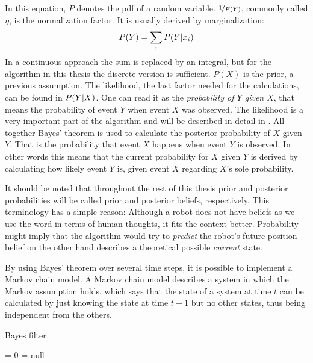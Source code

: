 \documentclass[Thesis.tex]{subfiles}
\begin{document}
In this equation, $P$ denotes the \gls{pdf} of a random variable. $\nicefrac{1}{P(Y)}$, commonly called $\eta$, is the normalization factor. It is usually derived by marginalization: 
\begin{align}
P(Y) = \sum\limits_i \p[P]{Y}{x_i}
\end{align}
In a continuous approach the sum is replaced by an integral, but for the algorithm in this thesis the discrete version is sufficient. $P(X)$ is the prior, a previous assumption.
The likelihood, the last factor needed for the calculations, can be found in $\p[P]{Y}{X}$. One can read it as the \emph{probability of $Y$ given $X$}, that means the probability of event $Y$ when event $X$ was observed. 
The likelihood is a very important part of the algorithm and will be described in detail in . All together Bayes' theorem is used to calculate the posterior probability of $X$ given $Y$. That is the probability that event $X$ happens when event $Y$ is observed. In other words this means that the current probability for $X$ given $Y$ is derived by calculating how likely event $Y$ is, given event $X$ regarding $X$'s sole probability. 

It should be noted that throughout the rest of this thesis prior and posterior probabilities will be called prior and posterior beliefs, respectively. This terminology has a simple reason: Although a robot does not have beliefs as we use the word in terms of human thoughts, it fits the context better. Probability might imply that the algorithm would try to \emph{predict} the robot's future position---belief on the other hand describes a theoretical possible \emph{current} state.

\bigskip

By using Bayes' theorem over several time steps, it is possible to implement a Markov chain model. A Markov chain model describes a system in which the Markov assumption holds, which says that the state of a system at time $t$ can be calculated by just knowing the state at time $t-1$ but no other states, thus being independent from the others.

\begin{algorithm}
\caption{Bayes filter}
\label{alg:bayesfilter}

\bayesfilter{} {
  \belief = 0\;
  \guess = null\;
}
\end{algorithm}
\end{document}
